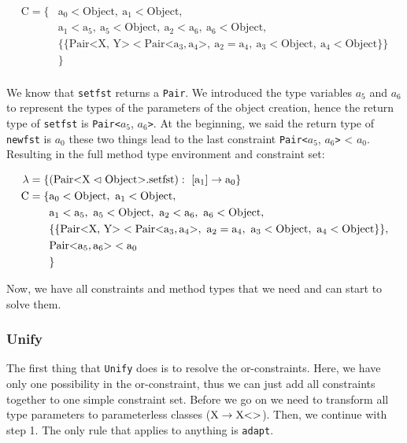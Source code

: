 \begin{align*}
    \text{C} = \{& \text{a}_0 < \text{Object}, \ \text{a}_1 < \text{Object}, \\
    &\text{a}_1 < \text{a}_5, \ \text{a}_5 < \text{Object}, \ \text{a}_2 < \text{a}_6, \ \text{a}_6 < \text{Object}, \\
    & \{ \{ \text{Pair<X, Y>} < \text{Pair<} \text{a}_3, \text{a}_4 \text{>}, \ \text{a}_2 = \text{a}_4, \ \text{a}_3 < \text{Object}, \ \text{a}_4 < \text{Object} \} \} \\
    &\}\\
\end{align*}

We know that \verb|setfst| returns a \verb|Pair|. We introduced the type variables $a_5$ and $a_6$ to represent the types of the parameters of the object creation, hence the return type of \verb|setfst| is \verb|Pair<|$a_5$, $a_6$\verb|>|.
At the beginning, we said the return type of \verb|newfst| is $a_0$ these two things lead to the last constraint \verb|Pair<|$a_5$, $a_6$\verb|>| < $a_0$.
Resulting in the full method type environment and constraint set:

\begin{align*}
    \lambda = \{& ( \cxnm{Pair}{X}{Object}{setfst} ): \ [\text{a}_1] \to \text{a}_0 \}\\
    \text{C} = \{& \text{a}_0 < \text{Object}, \ \text{a}_1 < \text{Object}, \\
    &\text{a}_1 < \text{a}_5, \ \text{a}_5 < \text{Object}, \ \text{a}_2 < \text{a}_6, \ \text{a}_6 < \text{Object}, \\
    & \{ \{ \text{Pair<X, Y>} < \text{Pair<} \text{a}_3, \text{a}_4 \text{>}, \ \text{a}_2 = \text{a}_4, \ \text{a}_3 < \text{Object}, \ \text{a}_4 < \text{Object} \} \},\\
    &\text{Pair<}\text{a}_5, \text{a}_6\text{>} < \text{a}_0\\
    &\}\\
\end{align*}

Now, we have all constraints and method types that we need and can start to solve them.

\subsubsection{Unify}
The first thing that \verb|Unify| does is to resolve the or-constraints. Here, we have only one possibility in the or-constraint, thus we can just add all constraints together to one simple constraint set.
Before we go on we need to transform all type parameters to parameterless classes ($\text{X} \to \text{X} \text{<}  \text{>}$).
Then, we continue with step 1. The only rule that applies to anything is \verb|adapt|.

